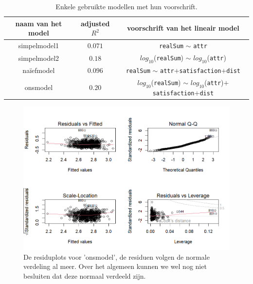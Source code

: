 \documentclass[a4paper]{kulakarticle}
\begin{document}
	\begin{table}[h]
		\centering
		\begin{tabular}{c|c|c}
			\centering
			naam van het model & adjusted $R^2$ & voorschrift van het lineair model \\
			\hline
			simpelmodel1 & $0.071$ & \verb*|realSum| $\sim$ \verb*|attr|\\
			simpelmodel2 &$0.18$ & $log_{10}$(\verb*|realSum|) $\sim$ $log_{10}$(\verb*|attr|) \\
			naïefmodel & $0.096$& \verb*|realSum| $\sim$ \verb*|attr|$+$\verb*|satisfaction|$+$\verb*|dist|\\
			onsmodel &$0.20$ & $log_{10}$(\verb*|realSum|) $\sim$ $log_{10}$(\verb*|attr|)$+$\verb*|satisfaction|$+$\verb*|dist|\\
		\end{tabular}
		\caption{Enkele gebruikte modellen met hun voorschrift.}
		\label{rsq}
	\end{table} %





	\begin{figure}
		\centering
		\includegraphics[width=0.9\linewidth]{Figuren/onsmodel}
		\caption{De residuplots voor 'onsmodel', de residuen volgen de normale verdeling al meer. Over het algemeen kunnen we wel nog niet besluiten dat deze normaal verdeeld zijn.}
		\label{fig:onsmodel}
	\end{figure}
	
\end{document}
